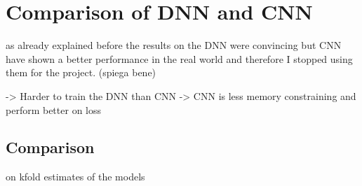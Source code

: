 \section{Comparison of DNN and CNN}

as already explained before the results on the DNN were convincing but
CNN have shown a better performance in the real world and therefore I stopped
using them for the project. (spiega bene)

-> Harder to train the DNN than CNN
-> CNN is less memory constraining and perform better on  loss

\subsection{Comparison}

on kfold estimates of the models

